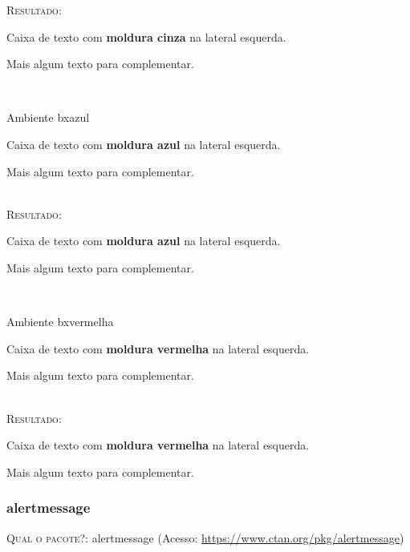 \textsc{Resultado:}
\ \\

\begin{bxcinza}
	Caixa de texto com \textbf{moldura cinza} na lateral esquerda. 
	
	Mais algum texto para complementar.  
\end{bxcinza}
\ \\

\begin{codex}{Ambiente bxazul}
	\begin{bxazul}
	Caixa de texto com \textbf{moldura azul} na lateral esquerda. 
	
	Mais algum texto para complementar.  
	\end{bxazul}
\end{codex}
\ \\

 \textsc{Resultado:}
 \ \\
 
\begin{bxazul}
	Caixa de texto com \textbf{moldura azul} na lateral esquerda. 
	
	Mais algum texto para complementar.  
\end{bxazul}
\ \\

\begin{codex}{Ambiente bxvermelha}
	\begin{bxvermelha}
	Caixa de texto com \textbf{moldura vermelha} na lateral esquerda. 
		
	Mais algum texto para complementar.  
	\end{bxvermelha}
\end{codex}
\ \\

\textsc{Resultado:}
\ \\

\begin{bxvermelha}
	Caixa de texto com \textbf{moldura vermelha} na lateral esquerda. 
	
	Mais algum texto para complementar.  
\end{bxvermelha}


\subsubsection{alertmessage}

\textsc{Qual o pacote?}: alertmessage (Acesso: \url{https://www.ctan.org/pkg/alertmessage})

